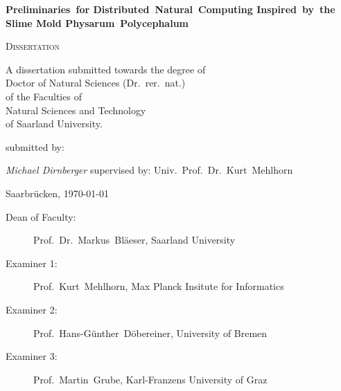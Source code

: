 
\begin{titlepage}
	\centering
	\null\vfill

	{\huge\bfseries Preliminaries~for Distributed~Natural~Computing Inspired~by~the Slime Mold Physarum~Polycephalum\par}


	\vfill

	{\scshape\Large Dissertation}
	\vfill



	{\large A dissertation submitted towards the degree of\\ 
	Doctor of Natural Sciences (Dr.~rer.~nat.)\\
	of the Faculties of\\
	Natural Sciences and Technology\\
	of Saarland University.}
	
	\vfill
	submitted by:
	\vfill

	{\Large\itshape Michael Dirnberger}
	\vfill
	supervised by:
	\vfill
	Univ.~Prof.~Dr.~Kurt~Mehlhorn

	\vfill

	{\large Saarbr\"ucken, \today}
\end{titlepage}


\newpage
\null
\vfill
\begin{description}
 	\item[Dean of Faculty:] Prof.~Dr.~Markus~Bl\"aeser, Saarland University
	\item[Examiner 1:] Prof.~Kurt~Mehlhorn, Max Planck Insitute for Informatics
	\item[Examiner 2:] Prof.~Hans-G\"unther~D\"obereiner, University of Bremen
	\item[Examiner 3:] Prof.~Martin~Grube, Karl-Franzens University of Graz
\end{description}

\newpage
